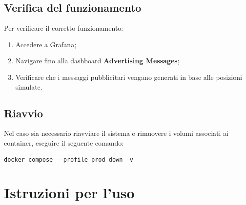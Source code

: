 \documentclass[10pt]{article}
\begin{document}
\begin{justify}
\subsection{Verifica del funzionamento}
Per verificare il corretto funzionamento:
\begin{enumerate}
    \item Accedere a Grafana;
    \item Navigare fino alla dashboard \textbf{Advertising Messages};
    \item Verificare che i messaggi pubblicitari vengano generati in base alle posizioni simulate.
\end{enumerate}

\subsection{Riavvio}
Nel caso sia necessario riavviare il sistema e rimuovere i volumi associati ai container, eseguire il seguente comando:
\begin{verbatim}
docker compose --profile prod down -v
\end{verbatim}


\newpage


\section{Istruzioni per l'uso}
\label{sec:uso}


\end{justify}
\end{document}
